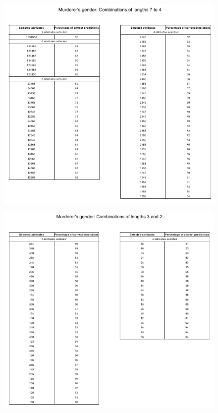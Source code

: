 \documentclass{mproj}
\begin{document}
\begin{figure}[h]
	\centering
	\includegraphics[width=\textwidth]{images/murderer_results1}
\end{figure}

\begin{figure}[h]
	\centering	
	\includegraphics[width=\textwidth]{images/murderer_results2}
\end{figure}
\end{document}
